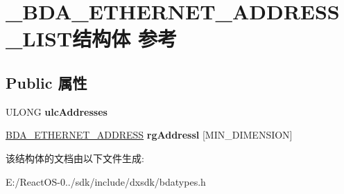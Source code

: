 \hypertarget{struct___b_d_a___e_t_h_e_r_n_e_t___a_d_d_r_e_s_s___l_i_s_t}{}\section{\+\_\+\+B\+D\+A\+\_\+\+E\+T\+H\+E\+R\+N\+E\+T\+\_\+\+A\+D\+D\+R\+E\+S\+S\+\_\+\+L\+I\+S\+T结构体 参考}
\label{struct___b_d_a___e_t_h_e_r_n_e_t___a_d_d_r_e_s_s___l_i_s_t}
\subsection*{Public 属性}
\begin{DoxyCompactItemize}
\item 
\mbox{\label{struct___b_d_a___e_t_h_e_r_n_e_t___a_d_d_r_e_s_s___l_i_s_t_a7980c74904486687f79007f3e77827e6}} 
U\+L\+O\+NG {\bfseries ulc\+Addresses}
\item 
\mbox{\label{struct___b_d_a___e_t_h_e_r_n_e_t___a_d_d_r_e_s_s___l_i_s_t_abf358ccc9c30a8ce47dec6ac61651ace}} 
\hyperlink{struct___b_d_a___e_t_h_e_r_n_e_t___a_d_d_r_e_s_s}{B\+D\+A\+\_\+\+E\+T\+H\+E\+R\+N\+E\+T\+\_\+\+A\+D\+D\+R\+E\+SS} {\bfseries rg\+Addressl} \mbox{[}M\+I\+N\+\_\+\+D\+I\+M\+E\+N\+S\+I\+ON\mbox{]}
\end{DoxyCompactItemize}


该结构体的文档由以下文件生成\+:\begin{DoxyCompactItemize}
\item 
E\+:/\+React\+O\+S-\/0../sdk/include/dxsdk/bdatypes.\+h\end{DoxyCompactItemize}
